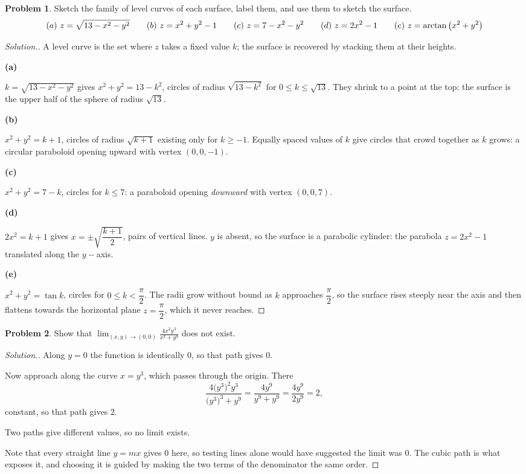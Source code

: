 \documentclass[11pt,a4paper]{article}
\theoremstyle{definition}
\newtheorem{problemx}{Problem}[subsection]
\newenvironment{problem}{\begin{problemx}}{\end{problemx}}
\newenvironment{solution}
  {\renewcommand{\qedsymbol}{}\begin{proof}[\textit{Solution}.]}
  {\end{proof}}
\newcommand{\subhead}[1]{%
  \par\medskip\noindent\textbf{#1}\par\nobreak\smallskip}
\begin{document}
\begin{problem}
Sketch the family of level curves of each surface, label them, and use them to
sketch the surface.
$$(a)\ z = \sqrt{13-x^2-y^2}\hspace{0.7cm}(b)\ z = x^2+y^2-1\hspace{0.7cm}
(c)\ z = 7-x^2-y^2\hspace{0.7cm}(d)\ z = 2x^2-1\hspace{0.7cm}
(e)\ z = \arctan\big(x^2+y^2\big)$$
\end{problem}
\begin{solution}
A level curve is the set where $z$ takes a fixed value $k$; the surface is
recovered by stacking them at their heights.

\subhead{(a)}
$k = \sqrt{13-x^2-y^2}$ gives $x^2+y^2 = 13-k^2$, circles of radius
$\sqrt{13-k^2}$ for $0\leq k\leq\sqrt{13}$. They shrink to a point at the top:
the surface is the upper half of the sphere of radius $\sqrt{13}$.

\subhead{(b)}
$x^2+y^2 = k+1$, circles of radius $\sqrt{k+1}$ existing only for $k\geq -1$.
Equally spaced values of $k$ give circles that crowd together as $k$ grows: a
circular paraboloid opening upward with vertex $(0,0,-1)$.

\subhead{(c)}
$x^2+y^2 = 7-k$, circles for $k\leq 7$: a paraboloid opening \emph{downward}
with vertex $(0,0,7)$.

\subhead{(d)}
$2x^2 = k+1$ gives $x = \pm\sqrt{\dfrac{k+1}{2}}$, pairs of vertical lines. $y$
is absent, so the surface is a parabolic cylinder: the parabola $z = 2x^2-1$
translated along the $y-$axis.

\subhead{(e)}
$x^2+y^2 = \tan k$, circles for $0\leq k<\dfrac{\pi}{2}$. The radii grow without
bound as $k$ approaches $\dfrac{\pi}{2}$, so the surface rises steeply near the
axis and then flattens towards the horizontal plane $z = \dfrac{\pi}{2}$, which
it never reaches.
\end{solution}

\begin{problem}
Show that $\displaystyle{\lim_{(x,y)\rightarrow(0,0)}\frac{4x^2y^3}{x^3+y^9}}$
does not exist.
\end{problem}
\begin{solution}
Along $y=0$ the function is identically $0$, so that path gives $0$.

Now approach along the curve $x = y^3$, which passes through the origin. There
$$\frac{4\big(y^3\big)^2y^3}{\big(y^3\big)^3+y^9}
= \frac{4y^9}{y^9+y^9} = \frac{4y^9}{2y^9} = 2 ,$$
constant, so that path gives $2$.

Two paths give different values, so no limit exists.

Note that every straight line $y = mx$ gives $0$ here, so testing lines alone
would have suggested the limit was $0$. The cubic path is what exposes it, and
choosing it is guided by making the two terms of the denominator the same order.
\end{solution}
\end{document}
